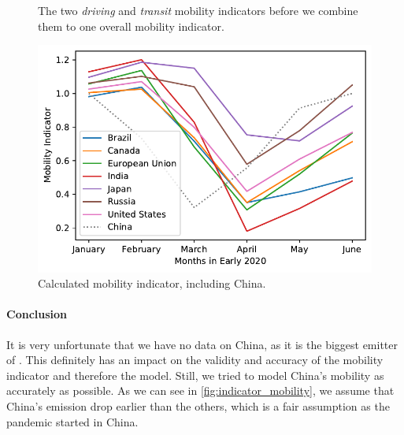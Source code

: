 \begin{figure}[ht!]
	\centering
	\hfill
	\caption{The two \textit{driving} and \textit{transit} mobility indicators before we combine them to one overall mobility indicator.}
	\label{fig:both_mobility_indicators}
\end{figure}

\begin{figure}[hb!]
	\centering
	\includegraphics[width=0.7\linewidth]{../predictions/full_mobility_indicator.pdf}
	\caption{Calculated mobility indicator, including China.}
	\label{fig:indicator_mobility}
\end{figure}

\paragraph{Conclusion}

It is very unfortunate that we have no data on China, as it is the biggest emitter of \co. This definitely has an impact on the validity and accuracy of the mobility indicator and therefore the model. Still, we tried to model China's mobility as accurately as possible. As we can see in \autoref{fig:indicator_mobility}, we assume that China's emission drop earlier than the others, which is a fair assumption as the pandemic started in China.